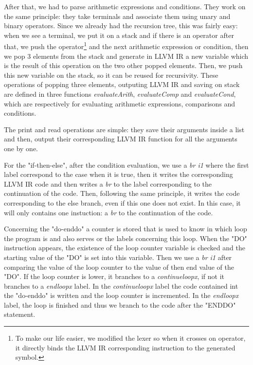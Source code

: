 \documentclass{article}
\begin{document}
After that, we had to parse arithmetic expressions and conditions. They work on the same principle: they take terminals and associate them using unary and binary operators. Since we already had the recursion tree, this was fairly easy: when we see a terminal, we put it on a stack and if there is an operator after that, we push the operator\footnote{To make our life easier, we modified the lexer so when it crosses on operator, it directly binds the LLVM IR corresponding instruction to the generated symbol.} and the next arithmetic expression or condition, then we pop 3 elements from the stack and generate in LLVM IR a new variable which is the result of this operation on the two other popped elements. Then, we push this new variable on the stack, so it can be reused for recursivity. These operations of popping three elements, outputing LLVM IR and saving on stack are defined in three functions \textit{evaluateArith}, \textit{evaluateComp} and \textit{evaluateCond}, which are respectively for evaluating arithmetic expressions, comparisons and conditions.

The print and read operations are simple: they save their arguments inside a list and then, output their corresponding LLVM IR function for all the arguments one by one.

For the "if-then-else", after the condition evaluation, we use a \textit{br i1} where the first label correspond to the case when it is true, then it writes the corresponding LLVM IR code and then writes a \textit{br} to the label corresponding to the continuation of the code. Then, following the same principle, it writes the code corresponding to the else branch, even if this one does not exist. In this case, it will only contains one instuction: a \textit{br} to the continuation of the code.

Concerning the "do-enddo" a counter is stored that is used to know in which loop the program is and also serves or the labels concerning this loop. When the "DO" instruction appears, the existence of the loop counter variable is checked and the starting value of the "DO" is set into this variable. Then we use a \textit{br i1} after comparing the value of the loop counter to the value of then end value of the "DO". If the loop counter is lower, it branches to a \textit{continueloopx}, if not it branches to a \textit{endloopx} label. In the \textit{continueloopx} label the code contained int the "do-enddo" is written and the loop counter is incremented.  In the \textit{endloopx} label, the loop is finished and thus we branch to the code after the "ENDDO" statement.
\end{document}

